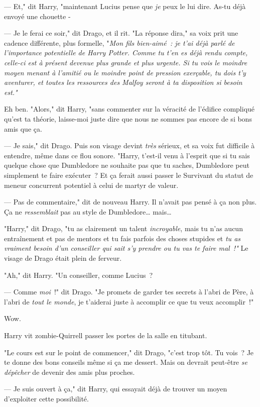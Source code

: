--- Et," dit Harry, "maintenant Lucius pense que \emph{je} peux le lui dire. As-tu déjà envoyé une chouette -

--- Je le ferai ce soir," dit Drago, et il rit. "La réponse dira," sa voix prit une cadence différente, plus formelle, "\emph{Mon fils bien-aimé~: je t'ai déjà parlé de l'importance potentielle de Harry Potter. Comme tu t'en es déjà rendu compte, celle-ci est à présent devenue plus grande et plus urgente. Si tu vois le moindre moyen menant à l'amitié ou le moindre point de pression exerçable, tu dois t'y aventurer, et toutes les ressources des Malfoy seront à ta disposition si besoin est."}

Eh ben. "Alors," dit Harry, "sans commenter sur la véracité de l'édifice compliqué qu'est ta théorie, laisse-moi juste dire que nous ne sommes pas encore de si bons amis que ça.

--- Je sais," dit Drago. Puis son visage devint \emph{très} sérieux, et sa voix fut difficile à entendre, même dans ce flou sonore. "Harry, t'est-il venu à l'esprit que si tu sais quelque chose que Dumbledore ne souhaite pas que tu saches, Dumbledore peut simplement te faire exécuter~? Et ça ferait aussi passer le Survivant du statut de meneur concurrent potentiel à celui de martyr de valeur.

--- Pas de commentaire," dit de nouveau Harry. Il n'avait pas pensé à ça non plus. Ça ne \emph{ressemblait} pas au style de Dumbledore… mais…

"Harry," dit Drago, "tu as clairement un talent \emph{incroyable}, mais tu n'as aucun entraînement et pas de mentors et tu fais parfois des choses stupides et \emph{tu as vraiment besoin d'un conseiller qui sait s'y prendre ou tu vas te faire mal~!"} Le visage de Drago était plein de ferveur.

"Ah," dit Harry. "Un conseiller, comme Lucius~?

--- Comme \emph{moi}~!" dit Drago. "Je promets de garder tes secrets à l'abri de Père, à l'abri de \emph{tout le monde}, je t'aiderai juste à accomplir ce que tu veux accomplir~!"

Wow.

Harry vit zombie-Quirrell passer les portes de la salle en titubant.

"Le cours est sur le point de commencer," dit Drago, "c'est trop tôt. Tu vois~? Je te donne des bons conseils même si ça me dessert. Mais on devrait peut-être \emph{se dépêcher} de devenir des amis plus proches.

--- Je suis ouvert à ça," dit Harry, qui essayait déjà de trouver un moyen d'exploiter cette possibilité.

